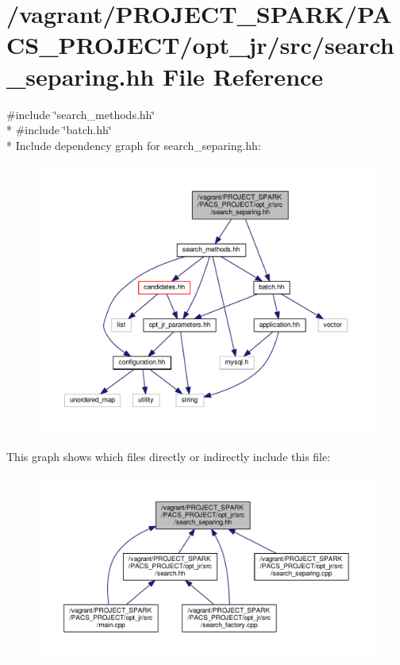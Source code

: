 \hypertarget{search__separing_8hh}{\section{/vagrant/\-P\-R\-O\-J\-E\-C\-T\-\_\-\-S\-P\-A\-R\-K/\-P\-A\-C\-S\-\_\-\-P\-R\-O\-J\-E\-C\-T/opt\-\_\-jr/src/search\-\_\-separing.hh File Reference}
\label{search__separing_8hh}
}
{\ttfamily \#include \char`\"{}search\-\_\-methods.\-hh\char`\"{}}\\*
{\ttfamily \#include \char`\"{}batch.\-hh\char`\"{}}\\*
Include dependency graph for search\-\_\-separing.\-hh\-:
\nopagebreak
\begin{figure}[H]
\begin{center}
\leavevmode
\includegraphics[width=350pt]{search__separing_8hh__incl}
\end{center}
\end{figure}
This graph shows which files directly or indirectly include this file\-:
\nopagebreak
\begin{figure}[H]
\begin{center}
\leavevmode
\includegraphics[width=350pt]{search__separing_8hh__dep__incl}
\end{center}
\end{figure}
